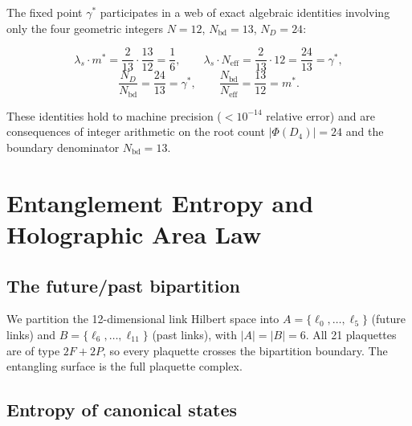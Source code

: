 \documentclass[12pt,a4paper]{article}
\theoremstyle{plain}
\theoremstyle{definition}
\newcommand{\lams}{\lambda_s}
\newcommand{\gstar}{\gamma^{*}}
\newcommand{\mstar}{m^{*}}
\newcommand{\Neff}{N_{\mathrm{eff}}}
\newcommand{\Nbd}{N_{\mathrm{bd}}}
\begin{document}
The fixed point $\gstar$ participates in a web of exact algebraic identities
involving only the four geometric integers $N=12$, $\Nbd=13$, $N_D=24$:

\begin{equation}
  \lams \cdot \mstar = \frac{2}{13} \cdot \frac{13}{12} = \frac{1}{6},
  \qquad
  \lams \cdot \Neff = \frac{2}{13} \cdot 12 = \frac{24}{13} = \gstar,
  \label{eq:identities}
\end{equation}
\begin{equation}
  \frac{N_D}{N_{\mathrm{bd}}} = \frac{24}{13} = \gstar,
  \qquad
  \frac{N_{\mathrm{bd}}}{\Neff} = \frac{13}{12} = \mstar.
\end{equation}

These identities hold to machine precision ($< 10^{-14}$ relative
error) and are consequences of integer arithmetic on the root count
$|\Phi(D_4)| = 24$ and the boundary denominator $\Nbd = 13$.

\section{Entanglement Entropy and Holographic Area Law}
\label{sec:entropy}

\subsection{The future/past bipartition}

We partition the 12-dimensional link Hilbert space into
$A = \{\ell_0,\ldots,\ell_5\}$ (future links) and
$B = \{\ell_6,\ldots,\ell_{11}\}$ (past links), with $|A| = |B| = 6$.
All 21 plaquettes are of type $2F+2P$, so every plaquette crosses the
bipartition boundary.  The entangling surface is the full plaquette complex.

\subsection{Entropy of canonical states}
\end{document}
